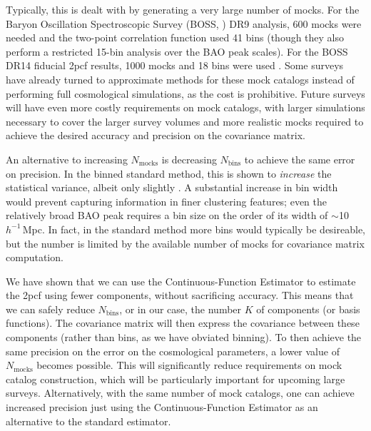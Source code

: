 \documentclass[modern]{aastex62}
\newcommand{\cf}{2pcf\xspace}
\newcommand{\est}{the Continuous-Function Estimator\xspace}
\newcommand{\hmpc}{$h^{-1}\,$Mpc}
\newcommand{\NN}[1]{N_\mathrm{#1}}
\begin{document}
Typically, this is dealt with by generating a very large number of mocks.
For the Baryon Oscillation Spectroscopic Survey (BOSS, \citealt{Dawson2013}) DR9 analysis, 600 mocks were needed and the two-point correlation function used 41 bins \citep{Sanchez2012} (though they also perform a restricted 15-bin analysis over the BAO peak scales). 
For the BOSS DR14 fiducial \cf results, 1000 mocks and 18 bins were used \cite{Ata2017}.
Some surveys have already turned to approximate methods for these mock catalogs instead of performing full cosmological simulations, as the cost is prohibitive.
Future surveys will have even more costly requirements on mock catalogs, with larger simulations necessary to cover the larger survey volumes and more realistic mocks required to achieve the desired accuracy and precision on the covariance matrix.

An alternative to increasing $\NN{mocks}$ is decreasing $\NN{bins}$ to achieve the same error on precision.
In the binned standard method, this is shown to \emph{increase} the statistical variance, albeit only slightly \citep{Percival2014}.
A substantial increase in bin width would prevent capturing information in finer clustering features; even the relatively broad BAO peak requires a bin size on the order of its width of $\sim$10\hmpc.
In fact, in the standard method more bins would typically be desireable, but the number is limited by the available number of mocks for covariance matrix computation.

We have shown that we can use \est to estimate the \cf using fewer components, without sacrificing accuracy.
This means that we can safely reduce $\NN{bins}$, or in our case, the number $K$ of components (or basis functions).
The covariance matrix will then express the covariance between these components (rather than bins, as we have obviated binning).
To then achieve the same precision on the error on the cosmological parameters, a lower value of $\NN{mocks}$ becomes possible.
This will significantly reduce requirements on mock catalog construction, which will be particularly important for upcoming large surveys. 
Alternatively, with the same number of mock catalogs, one can achieve increased precision just using \est as an alternative to the standard estimator.
\end{document}
